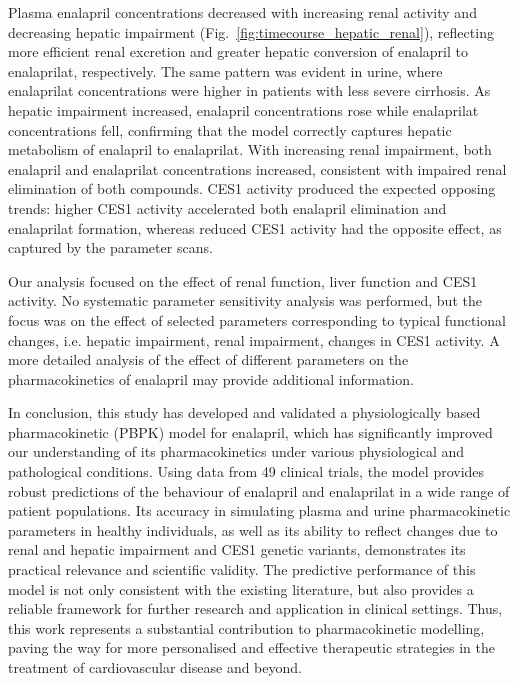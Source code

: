 \documentclass[pharmaceutics,article,submit,pdftex,moreauthors]{Definitions/mdpi}
\begin{document}
Plasma enalapril concentrations decreased with increasing renal activity and decreasing hepatic impairment (Fig.~\ref{fig:timecourse_hepatic_renal}), reflecting more efficient renal excretion and greater hepatic conversion of enalapril to enalaprilat, respectively. The same pattern was evident in urine, where enalaprilat concentrations were higher in patients with less severe cirrhosis. As hepatic impairment increased, enalapril concentrations rose while enalaprilat concentrations fell, confirming that the model correctly captures hepatic metabolism of enalapril to enalaprilat. With increasing renal impairment, both enalapril and enalaprilat concentrations increased, consistent with impaired renal elimination of both compounds. CES1 activity produced the expected opposing trends: higher CES1 activity accelerated both enalapril elimination and enalaprilat formation, whereas reduced CES1 activity had the opposite effect, as captured by the parameter scans.

Our analysis focused on the effect of renal function, liver function and CES1 activity. No systematic parameter sensitivity analysis was performed, but the focus was on the effect of selected parameters corresponding to typical functional changes, i.e. hepatic impairment, renal impairment, changes in CES1 activity. A more detailed analysis of the effect of different parameters on the pharmacokinetics of enalapril may provide additional information.

In conclusion, this study has developed and validated a physiologically based pharmacokinetic (PBPK) model for enalapril, which has significantly improved our understanding of its pharmacokinetics under various physiological and pathological conditions. Using data from 49 clinical trials, the model provides robust predictions of the behaviour of enalapril and enalaprilat in a wide range of patient populations. Its accuracy in simulating plasma and urine pharmacokinetic parameters in healthy individuals, as well as its ability to reflect changes due to renal and hepatic impairment and CES1 genetic variants, demonstrates its practical relevance and scientific validity. The predictive performance of this model is not only consistent with the existing literature, but also provides a reliable framework for further research and application in clinical settings. Thus, this work represents a substantial contribution to pharmacokinetic modelling, paving the way for more personalised and effective therapeutic strategies in the treatment of cardiovascular disease and beyond.
\end{document}
